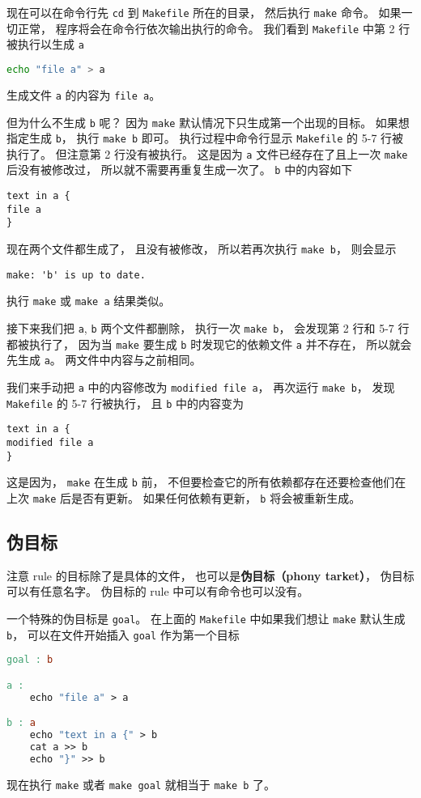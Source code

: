 现在可以在命令行先 \verb|cd| 到 \verb|Makefile| 所在的目录， 然后执行 \verb|make| 命令。 如果一切正常， 程序将会在命令行依次输出执行的命令。 我们看到 \verb|Makefile| 中第 2 行被执行以生成 \verb|a|
\begin{lstlisting}[language=bash]
echo "file a" > a
\end{lstlisting}
生成文件 \verb|a| 的内容为 \verb|file a|。

但为什么不生成 \verb|b| 呢？ 因为 \verb|make| 默认情况下只生成第一个出现的目标。 如果想指定生成 \verb|b|， 执行 \verb|make b| 即可。 执行过程中命令行显示 \verb|Makefile| 的 5-7 行被执行了。 但注意第 2 行没有被执行。 这是因为 \verb|a| 文件已经存在了且上一次 \verb|make| 后没有被修改过， 所以就不需要再重复生成一次了。 \verb|b| 中的内容如下
\begin{lstlisting}[language=none]
text in a {
file a
}
\end{lstlisting}

现在两个文件都生成了， 且没有被修改， 所以若再次执行 \verb|make b|， 则会显示
\begin{lstlisting}[language=none]
make: 'b' is up to date.
\end{lstlisting}
执行 \verb|make| 或 \verb|make a| 结果类似。

接下来我们把 \verb|a|, \verb|b| 两个文件都删除， 执行一次 \verb|make b|， 会发现第 2 行和 5-7 行都被执行了， 因为当 \verb|make| 要生成 \verb|b| 时发现它的依赖文件 \verb|a| 并不存在， 所以就会先生成 \verb|a|。 两文件中内容与之前相同。

我们来手动把 \verb|a| 中的内容修改为 \verb|modified file a|， 再次运行 \verb|make b|， 发现 \verb|Makefile| 的 5-7 行被执行， 且 \verb|b| 中的内容变为
\begin{lstlisting}[language=none]
text in a {
modified file a
}
\end{lstlisting}
这是因为， \verb|make| 在生成 \verb|b| 前， 不但要检查它的所有依赖都存在还要检查他们在上次 \verb|make| 后是否有更新。 如果任何依赖有更新， \verb|b| 将会被重新生成。

\subsection{伪目标}
注意 rule 的目标除了是具体的文件， 也可以是\textbf{伪目标（phony tarket）}， 伪目标可以有任意名字。 伪目标的 rule 中可以有命令也可以没有。

一个特殊的伪目标是 \verb|goal|。 在上面的 \verb|Makefile| 中如果我们想让 \verb|make| 默认生成 \verb|b|， 可以在文件开始插入 \verb|goal| 作为第一个目标
\begin{lstlisting}[language=makefile]
goal : b

a :
	echo "file a" > a

b : a
	echo "text in a {" > b
	cat a >> b
	echo "}" >> b
\end{lstlisting}
现在执行 \verb|make| 或者 \verb|make goal| 就相当于 \verb|make b| 了。

